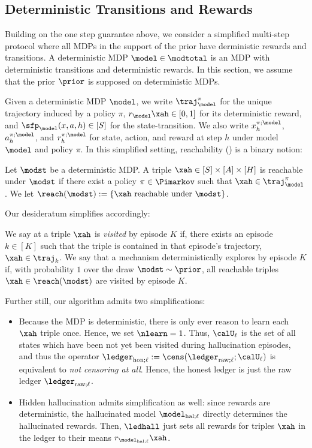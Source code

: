 \newcommand{\moddet}{\calM_{\mathrm{det}}}
\subsection{Deterministic Transitions and Rewards}

Building on the one step guarantee above, we consider a simplified multi-step protocol where all MDPs in the support of the prior have derministic rewards and transitions. A deterministic MDP $\model \in \modtotal$ is an MDP with deterministic transitions and deterministic rewards. In this section, we assume that the prior $\prior$ is supposed on deterministic MDPs.

Given a deterministic MDP $\model$, we write $\traj^{\pi}_{\model}$ for the unique trajectory induced by a policy $\pi$, $r_{\model}\xah \in [0,1]$ for its deterministic reward, and $\sfp_{\model}(x,a,h) \in [S]$ for the state-transition. We also write $x_h^{\pi;\model}$,$a_h^{\pi;\model}$, and $r_h^{\pi;\model}$ for state, action, and reward at step $h$ under model $\model$ and policy $\pi$. In this simplified setting, reachability () is a binary notion:
\begin{definition}\label{def:determ_reachable} Let $\modst$ be a deterministic MDP. A triple $\xah \in [S] \times [A] \times [H]$ is reachable under $\modst$ if there exist a policy $\pi \in \Pimarkov$ such that $\xah \in \traj^{\pi}_{\model}$. We let $\reach(\modst) := \{\xah \text{ reachable under } \modst\}$.
\end{definition}
Our desideratum simplifies accordingly:
\begin{desid}\label{desid:det} We say at a triple $\xah$ is \emph{visited} by episode $K$ if, there exists an episode $k \in [K]$ such that the triple is contained in that episode's trajectory, $\xah \in \traj_{k}$.  We say that a mechanism deterministically explores by episode $K$ if, with probability $1$ over the draw $\modst \sim \prior$, all reachable triples $\xah \in \reach(\modst)$ are visited by episode $K$.
\end{desid}

Further still, our algorithm admits two simplifications:
\begin{itemize}
	\item Because the MDP is deterministic, there is only ever reason to learn each $\xah$ triple once. Hence, we set $\nlearn = 1$. Thus, $\calU_{\ell}$ is the set of all states which have been not yet been visited during hallucination episodes, and thus the operator $\ledhonl := \cens(\ledrawl;\calU_{\ell})$ is equivalent to \emph{not censoring at all}. Hence, the honest ledger is just the raw ledger $\ledrawl$.
	\item Hidden hallucination admits simplification as well: since rewards are deterministic, the hallucinated model $\modhall$ directly determines the hallucinated rewards. Then, $\ledhall$ just sets all rewards for triples $\xah$ in the ledger to their means $r_{\modhall}\xah$.
\end{itemize}




